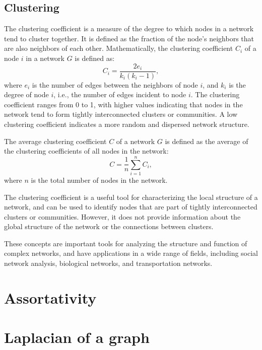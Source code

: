 \subsection{Clustering}

The clustering coefficient is a measure of the degree to which nodes in a network tend to cluster together. It is defined as the fraction of the node's neighbors that are also neighbors of each other. Mathematically, the clustering coefficient $C_i$ of a node $i$ in a network $G$ is defined as:
\begin{equation}
    C_i = \frac{2e_i}{k_i (k_i - 1)},
\end{equation}
where $e_i$ is the number of edges between the neighbors of node $i$, and $k_i$ is the degree of node $i$, i.e., the number of edges incident to node $i$. The clustering coefficient ranges from 0 to 1, with higher values indicating that nodes in the network tend to form tightly interconnected clusters or communities. A low clustering coefficient indicates a more random and dispersed network structure.

The average clustering coefficient $C$ of a network $G$ is defined as the average of the clustering coefficients of all nodes in the network:
\begin{equation}
    C = \frac{1}{n} \sum_{i=1}^n C_i,
\end{equation}
where $n$ is the total number of nodes in the network.

The clustering coefficient is a useful tool for characterizing the local structure of a network, and can be used to identify nodes that are part of tightly interconnected clusters or communities. However, it does not provide information about the global structure of the network or the connections between clusters.

These concepts are important tools for analyzing the structure and function of complex networks, and have applications in a wide range of fields, including social network analysis, biological networks, and transportation networks.

\section{Assortativity}



\section{Laplacian of a graph}

